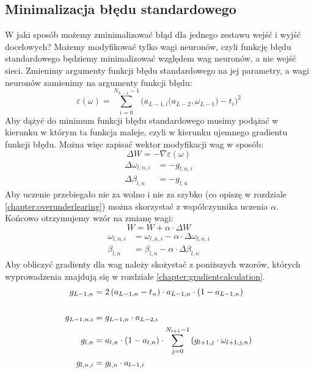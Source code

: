 \documentclass[]{article}
\begin{document}
	\subsection{Minimalizacja błędu standardowego}
		W jaki sposób możemy zminimalizować błąd dla jednego zestawu wejść i wyjść docelowych? Możemy modyfikować tylko wagi neuronów, czyli funkcję błędu standardowego będziemy minimalizować względem wag neuronów, a nie wejść sieci. Zmienimy argumenty funkcji błędu standardowego na jej parametry, a wagi neuronów zamienimy na argumenty funkcji błędu:
		\begin{equation} \label{eq:standarderror:2}
			\varepsilon \left( \omega \right) = \sum_{i=0}^ {N_{L-1}-1 } \bigg( a_{L-1,i} \Big( a_{L-2}, \omega_{L-1} \Big) - t_{i} \bigg)^{2}
		\end{equation}
		Aby dążyć do minimum funkcji błędu standardowego musimy podążać w kierunku w którym ta funkcja maleje, czyli w kierunku ujemnego gradientu funkcji błędu. Można więc zapisać wektor modyfikacji wag w sposób:
		\begin{equation} \label{eq:deltaweight:1}
			\Delta W = - \nabla \varepsilon\left( \omega \right)
		\end{equation}
		\begin{equation} \label{eq:deltaweight:2}
			\begin{split}
				\Delta\omega_{l,n,i} &= - g_{l,n,i} \\
				\Delta\beta_{l,n} &= - g_{l,n}
			\end{split}
		\end{equation}
		Aby uczenie przebiegało nie za wolno i nie za szybko (co opiszę w rozdziale \ref{chapter:overunderlearing}) można skorzystać z współczynnika uczenia $\alpha$. Końcowo otrzymujemy wzór na zmianę wagi:
		\begin{equation} \label{eq:changeweight:1}
			W = W + \alpha \cdot \Delta W
		\end{equation}
		\begin{equation} \label{eq:changeweight:2}
			\begin{split}
				\omega_{l,n,i} &= \omega_{l,n,i} - \alpha \cdot \Delta\omega_{l,n,i} \\
				\beta_{l,n} &= \beta_{l,n} - \alpha \cdot \Delta\beta_{l,n}
			\end{split}
		\end{equation}
		Aby obliczyć gradienty dla wag należy skożystać z poniższych wzorów, których wyprowadzenia znajdują się w rozdziale \ref{chapter:gradientcalculation}.
		\begin{equation} \notag
			\begin{split}
				g_{L-1,n} &= 2\left( a_{L-1,n} - t_{n} \right) \cdot a_{L-1,n} \cdot \left( 1 - a_{L-1,n} \right) \\ \\
				g_{L-1,n,i} &= g_{L-1,n} \cdot a_{L-2,i} \\
				g_{l,n} &= a_{l,n} \cdot \left( 1 - a_{l,n} \right) \cdot \sum\limits_{j=0}^{N_{l+1}-1} \left( g_{l+1,j} \cdot \omega_{l+1,j,n} \right) \\
				g_{l,n,i} &= g_{l,n} \cdot a_{l-1,i}
			\end{split}
		\end{equation}
\end{document}
